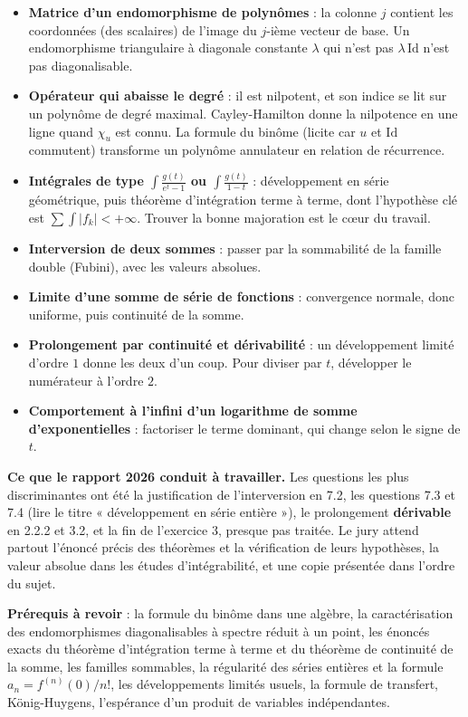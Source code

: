 \documentclass[11pt,a4paper]{article}
\providecommand{\tightlist}{\setlength{\itemsep}{0pt}\setlength{\parskip}{0pt}}
\begin{document}
\begin{itemize}
\tightlist
\item
  \textbf{Matrice d'un endomorphisme de polynômes} : la colonne \(j\) contient les coordonnées (des scalaires) de l'image du \(j\)-ième vecteur de base. Un endomorphisme triangulaire à diagonale constante \(\lambda\) qui n'est pas \(\lambda\,\mathrm{Id}\) n'est pas diagonalisable.
\item
  \textbf{Opérateur qui abaisse le degré} : il est nilpotent, et son indice se lit sur un polynôme de degré maximal. Cayley-Hamilton donne la nilpotence en une ligne quand \(\chi_u\) est connu. La formule du binôme (licite car \(u\) et \(\mathrm{Id}\) commutent) transforme un polynôme annulateur en relation de récurrence.
\item
  \textbf{Intégrales de type \(\int\frac{g(t)}{e^t-1}\) ou \(\int\frac{g(t)}{1-t}\)} : développement en série géométrique, puis théorème d'intégration terme à terme, dont l'hypothèse clé est \(\sum\int|f_k|<+\infty\). Trouver la bonne majoration est le cœur du travail.
\item
  \textbf{Interversion de deux sommes} : passer par la sommabilité de la famille double (Fubini), avec les valeurs absolues.
\item
  \textbf{Limite d'une somme de série de fonctions} : convergence normale, donc uniforme, puis continuité de la somme.
\item
  \textbf{Prolongement par continuité et dérivabilité} : un développement limité d'ordre \(1\) donne les deux d'un coup. Pour diviser par \(t\), développer le numérateur à l'ordre \(2\).
\item
  \textbf{Comportement à l'infini d'un logarithme de somme d'exponentielles} : factoriser le terme dominant, qui change selon le signe de \(t\).
\end{itemize}

\textbf{Ce que le rapport 2026 conduit à travailler.} Les questions les plus discriminantes ont été la justification de l'interversion en 7.2, les questions 7.3 et 7.4 (lire le titre « développement en série entière »), le prolongement \textbf{dérivable} en 2.2.2 et 3.2, et la fin de l'exercice 3, presque pas traitée. Le jury attend partout l'énoncé précis des théorèmes et la vérification de leurs hypothèses, la valeur absolue dans les études d'intégrabilité, et une copie présentée dans l'ordre du sujet.

\textbf{Prérequis à revoir} : la formule du binôme dans une algèbre, la caractérisation des endomorphismes diagonalisables à spectre réduit à un point, les énoncés exacts du théorème d'intégration terme à terme et du théorème de continuité de la somme, les familles sommables, la régularité des séries entières et la formule \(a_n=f^{(n)}(0)/n!\), les développements limités usuels, la formule de transfert, König-Huygens, l'espérance d'un produit de variables indépendantes.
\end{document}
